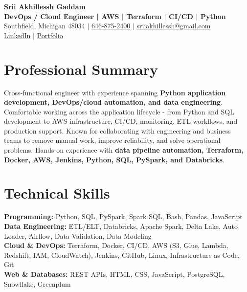 \documentclass[letterpaper,10pt]{article}
\begin{document}
\fontsize{9.35pt}{10.45pt}\selectfont

\begin{center}
    {\LARGE \textbf{Srii Akhillessh Gaddam}} \\[-1pt]
    \textbf{DevOps / Cloud Engineer | AWS | Terraform | CI/CD | Python} \\[2pt]
    Southfield, Michigan 48034 $|$
    \href{tel:6468752400}{646-875-2400} $|$
    \href{mailto:sriiakhillessh@gmail.com}{sriiakhillessh@gmail.com} \\[1pt]
    \href{https://www.linkedin.com/in/srii-akhiilessh-gaddam-b48668191/}{LinkedIn} $|$
    \href{https://sriiakhillesshg.github.io/portfolio/}{Portfolio}
\end{center}
\vspace{-8pt}

\section{Professional Summary}
\small{Cross-functional engineer with experience spanning \textbf{Python application development, DevOps/cloud automation, and data engineering}. Comfortable working across the application lifecycle - from Python and SQL development to AWS infrastructure, CI/CD, monitoring, ETL workflows, and production support. Known for collaborating with engineering and business teams to remove manual work, improve reliability, and solve operational problems. Hands-on experience with \textbf{data pipeline automation, Terraform, Docker, AWS, Jenkins, Python, SQL, PySpark, and Databricks}.}

\section{Technical Skills}
\small{
\textbf{Programming:} Python, SQL, PySpark, Spark SQL, Bash, Pandas, JavaScript \\
\textbf{Data Engineering:} ETL/ELT, Databricks, Apache Spark, Delta Lake, Auto Loader, Airflow, Data Validation, Data Modeling \\
\textbf{Cloud \& DevOps:} Terraform, Docker, CI/CD, AWS (S3, Glue, Lambda, Redshift, IAM, CloudWatch), Jenkins, GitHub, Linux, Infrastructure as Code, Git \\
\textbf{Web \& Databases:} REST APIs, HTML, CSS, JavaScript, PostgreSQL, Snowflake, Greenplum
}
\end{document}
